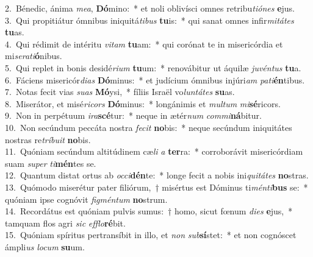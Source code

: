 {2.~}Bénedic, ánima \textit{me}\textit{a}, \textbf{Dó}mino:~* et noli oblivísci omnes retribu\textit{ti}\textit{ó}\textit{nes} \textbf{e}jus.\\
{3.~}Qui propitiátur ómnibus iniquitá\textit{ti}\textit{bus} \textbf{tu}is:~* qui sanat omnes infir\textit{mi}\textit{tá}\textit{tes} \textbf{tu}as.\\
{4.~}Qui rédimit de intéritu \textit{vi}\textit{tam} \textbf{tu}am:~* qui corónat te in misericórdia et mi\textit{se}\textit{ra}\textit{ti}\textbf{ó}nibus.\\
{5.~}Qui replet in bonis desidé\textit{ri}\textit{um} \textbf{tu}um:~* renovábitur ut áquilæ \textit{ju}\textit{vén}\textit{tus} \textbf{tu}a.\\
{6.~}Fáciens misericór\textit{di}\textit{as} \textbf{Dó}minus:~* et judícium ómnibus injúri\textit{am} \textit{pa}\textit{ti}\textbf{én}tibus.\\
{7.~}Notas fecit vias \textit{su}\textit{as} \textbf{Mó}ysi,~* fíliis Israël vo\textit{lun}\textit{tá}\textit{tes} \textbf{su}as.\\
{8.~}Miserátor, et misé\textit{ri}\textit{cors} \textbf{Dó}minus:~* longánimis et \textit{mul}\textit{tum} \textit{mi}\textbf{sé}ricors.\\
{9.~}Non in perpétuum \textit{i}\textit{ra}\textbf{scé}tur:~* neque in ætér\textit{num} \textit{com}\textit{mi}\textbf{ná}bitur.\\
{10.~}Non secúndum peccáta nostra \textit{fe}\textit{cit} \textbf{no}bis:~* neque secúndum iniquitátes nostras re\textit{trí}\textit{bu}\textit{it} \textbf{no}bis.\\
{11.~}Quóniam secúndum altitúdinem cæ\textit{li} \textit{a} \textbf{ter}ra:~* corroborávit misericórdiam suam \textit{su}\textit{per} \textit{ti}\textbf{mén}tes se.\\
{12.~}Quantum distat ortus ab \textit{oc}\textit{ci}\textbf{dén}te:~* longe fecit a nobis ini\textit{qui}\textit{tá}\textit{tes} \textbf{no}stras.\\
{13.~}Quómodo miserétur pater filiórum,~† misértus est Dóminus ti\textit{mén}\textit{ti}\textbf{bus} se:~* quóniam ipse cognóvit \textit{fig}\textit{mén}\textit{tum} \textbf{no}strum.\\
{14.~}Recordátus est quóniam pulvis sumus:~† homo, sicut fœnum \textit{di}\textit{es} \textbf{e}jus,~* tamquam flos agri \textit{sic} \textit{ef}\textit{flo}\textbf{ré}bit.\\
{15.~}Quóniam spíritus pertransíbit in illo, et \textit{non} \textit{sub}\textbf{sí}stet:~* et non cognóscet ámpli\textit{us} \textit{lo}\textit{cum} \textbf{su}um.\\
